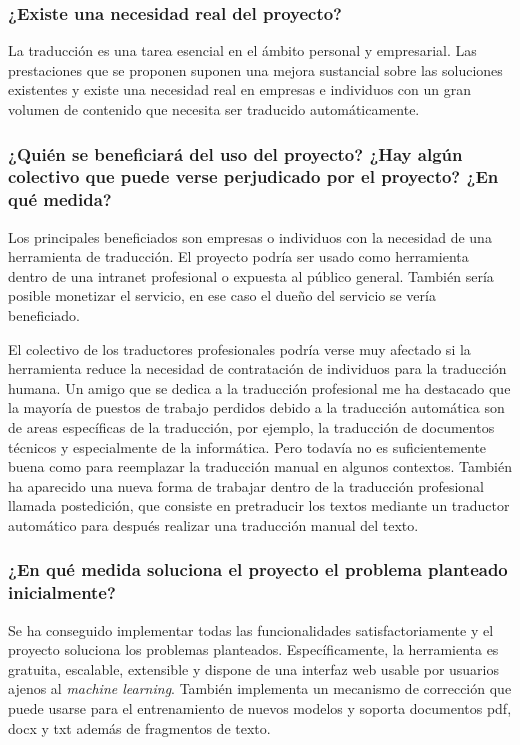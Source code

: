 \subsubsection{¿Existe una necesidad real del proyecto?}

La traducción es una tarea esencial en el ámbito personal y empresarial. Las prestaciones que se proponen
suponen una mejora sustancial sobre las soluciones existentes y existe una necesidad real en empresas
e individuos con un gran volumen de contenido que necesita ser traducido automáticamente.

\subsubsection{¿Quién se beneficiará del uso del proyecto? ¿Hay algún colectivo que puede verse perjudicado por el proyecto? ¿En qué medida?}

Los principales beneficiados son empresas o individuos con la necesidad de una herramienta de traducción. El proyecto podría ser usado como herramienta dentro de una intranet profesional o expuesta al público general. También sería posible monetizar el servicio, en ese caso el dueño del servicio se vería beneficiado.

El colectivo de los traductores profesionales podría verse muy afectado si la herramienta reduce la necesidad de contratación de individuos para la traducción humana. 
Un amigo que se dedica a la traducción profesional me ha destacado que la mayoría de puestos de trabajo perdidos debido a la traducción automática son de areas específicas de la traducción, por ejemplo, la traducción de documentos técnicos y especialmente de la informática. Pero todavía no es suficientemente buena como para reemplazar la traducción manual en algunos contextos.
También ha aparecido una nueva forma de trabajar dentro de la traducción profesional llamada postedición, que consiste en pretraducir los textos mediante un traductor automático para después realizar una traducción manual del texto.

\subsubsection{¿En qué medida soluciona el proyecto el problema planteado inicialmente?}

Se ha conseguido implementar todas las funcionalidades satisfactoriamente y el proyecto soluciona los problemas planteados. Específicamente, la herramienta es gratuita, escalable, extensible y dispone de una interfaz web usable por usuarios ajenos al \textit{machine learning}. También implementa un mecanismo de corrección que puede usarse para el entrenamiento de nuevos modelos y soporta documentos pdf, docx y txt además de fragmentos de texto.

